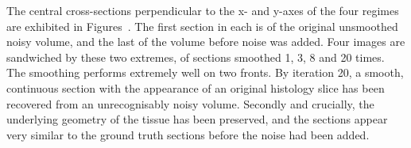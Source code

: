   The central cross-sections perpendicular to the x- and y-axes of the four regimes are exhibited in Figures~. The first section in each is of the original unsmoothed noisy volume, and the last of the volume before noise was added. Four images are sandwiched by these two extremes, of sections smoothed 1, 3, 8 and 20 times. The smoothing performs extremely well on two fronts. By iteration 20, a smooth, continuous section with the appearance of an original histology slice has been recovered from an unrecognisably noisy volume. Secondly and crucially, the underlying geometry of the tissue has been preserved, and the sections appear very similar to the ground truth sections before the noise had been added.
  
